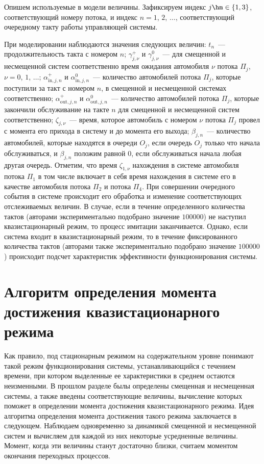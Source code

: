 Опишем используемые в модели величины.
Зафиксируем индекс $j\hm\in \{1, 3\}$, соответствующий номеру потока, и индекс $n=1$, $2$, $\ldots$, соответствующий очередному такту работы управляющей системы.

 При моделировании наблюдаются значения следующих величин: $t_n$~--- продолжительность такта с номером $n$; $\gamma_{j,\nu}^+$ и $\gamma_{j,\nu}^0$~--- для смещенной и несмещенной систем соответственно время ожидания  автомобиля $\nu$ потока $\Pi_j$, $\nu=0$, $1$, $\ldots$;
 $\alpha^{+}_{\text{in},j,n}$ и $\alpha^{0}_{\text{in}, j,n}$~--- количество автомобилей потока $\Pi_j$, которые поступили за такт с номером $n$, в смещенной и несмещенной системах соответственно; 
 $\alpha^{+}_{\text{out},j,n}$ и $\alpha^{0}_{\text{out},j,n}$~--- количество автомобилей потока $\Pi_j$, которые закончили обслуживание на такте $n$ для смещенной и несмещенной систем соответственно;  $\zeta_{j,\nu}$~--- время, которое автомобиль с номером $\nu$ потока $\Pi_j$ провел с момента его прихода в систему и до момента его выхода; $\beta_{j,n}$~--- количество автомобилей, которые находятся в очереди $O_j$, если очередь $O_j$ только что начала обслуживаться, и $\beta_{j,n}$ положим равной $0$, если обслуживаться начала любая другая очередь. Отметим, что время $\zeta_{1,\nu}$ нахождения в системе автомобиля потока $\Pi_1$ в том числе включает в себя время нахождения в системе его в качестве автомобиля потока $\Pi_2$ и потока $\Pi_4$. При совершении очередного события в системе происходит его обработка и изменение соответствующих отслеживаемых величин. В случае, если в течение определенного количества тактов (авторами экспериментально подобрано значение $100000$) не наступил квазистационарный режим, то процесс имитации заканчивается. Однако, если система входит в квазистационарный режим, то в течение фиксированного количества тактов (авторами также экспериментально подобрано значение $100000$) происходит подсчет характеристик эффективности функционирования системы.



\section{Алгоритм определения момента достижения квазистационарного режима}
Как правило, под стационарным режимом на содержательном уровне понимают такой режим функционирования системы, устанавливающийся с течением времени, при котором выделенные ее характеристики в среднем остаются неизменными. В прошлом разделе былы определены смещенная и несмещенная системы, а также введены соответствующие величины, вычисление которых поможет в определении момента достижения квазистационарного режима.   Идея алгоритма определения момента достижения  такого режима заключается в следующем. Наблюдаем одновременно за динамикой смещенной и несмещенной систем и вычисляем для каждой из них некоторые усредненные величины. Момент, когда эти величины станут достаточно близки, считаем моментом окончания переходных процессов. 

